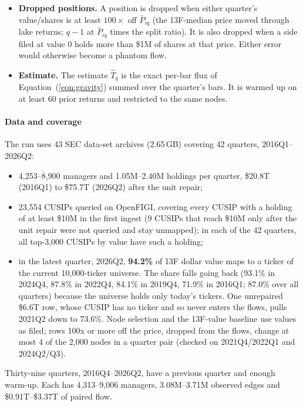 \documentclass[preprint,3p,twocolumn]{elsarticle}
\begin{document}
\begin{itemize}
\item \textbf{Dropped positions.} A position is dropped when either quarter's value/shares is at least $100\times$ off $\bar P_{iq}$ (the 13F-median price moved through lake returns; $q-1$ at $\bar P_{iq}$ times the split ratio). It is also dropped when a side filed at value 0 holds more than \$1M of shares at that price. Either error would otherwise become a phantom flow.
\item \textbf{Estimate.} The estimate $\hat T_q$ is the exact per-bar flux of Equation~(\ref{eqn:gravity}) summed over the quarter's bars. It is warmed up on at least 60 prior returns and restricted to the same nodes.
\end{itemize}

\paragraph{Data and coverage} The run uses 43 SEC data-set archives (2.65\,GB) covering 42 quarters, 2016Q1--2026Q2:
\begin{itemize}
\item 4,253--8,900 managers and 1.05M--2.40M holdings per quarter, \$20.8T (2016Q1) to \$75.7T (2026Q2) after the unit repair;
\item 23,554 CUSIPs queried on OpenFIGI, covering every CUSIP with a holding of at least \$10M in the first ingest (9 CUSIPs that reach \$10M only after the unit repair were not queried and stay unmapped); in each of the 42 quarters, all top-3,000 CUSIPs by value have such a holding;
\item in the latest quarter, 2026Q2, \textbf{94.2\%} of 13F dollar value maps to a ticker of the current 10,000-ticker universe. The share falls going back (93.1\% in 2024Q4, 87.8\% in 2022Q4, 84.1\% in 2019Q4, 71.9\% in 2016Q1; 87.0\% over all quarters) because the universe holds only today's tickers. One unrepaired \$6.6T row, whose CUSIP has no ticker and so never enters the flows, pulls 2021Q2 down to 73.6\%. Node selection and the 13F-value baseline use values as filed; rows 100x or more off the price, dropped from the flows, change at most 4 of the 2,000 nodes in a quarter pair (checked on 2021Q4/2022Q1 and 2024Q2/Q3).
\end{itemize}
Thirty-nine quarters, 2016Q4--2026Q2, have a previous quarter and enough warm-up. Each has 4,313--9,006 managers, 3.08M--3.71M observed edges and \$0.91T--\$3.37T of paired flow.
\end{document}
